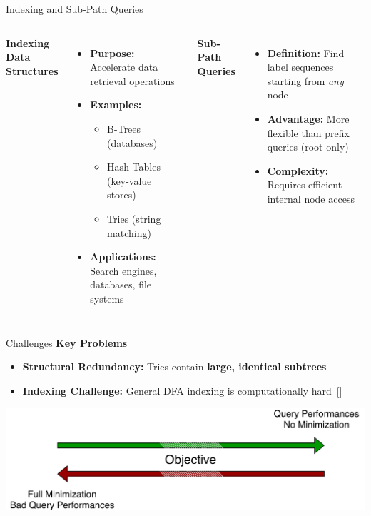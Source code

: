 \documentclass[aspectratio=169]{beamer}
\begin{document}
\begin{frame}{Indexing and Sub-Path Queries}
	\begin{columns}[t]
		\textcolor{oiBlue}{\textbf{Indexing Data Structures}}
		\begin{itemize}
			\item \textbf{Purpose:} Accelerate data retrieval operations
			\item \textbf{Examples:}
			      \begin{itemize}
				      \item B-Trees (databases)
				      \item Hash Tables (key-value stores)
				      \item Tries (string matching)
			      \end{itemize}
			\item \textbf{Applications:} Search engines, databases, file systems
		\end{itemize}

		\textcolor{oiRed}{\textbf{Sub-Path Queries}}
		\begin{itemize}
			\item \textbf{Definition:} Find label sequences starting from \textit{any} node
			\item \textbf{Advantage:} More flexible than prefix queries (root-only)
			\item \textbf{Complexity:} Requires efficient internal node access
		\end{itemize}
	\end{columns}
\end{frame}

\begin{frame}{Challenges}
	\textcolor{oiRed}{\textbf{Key Problems}}
	\begin{itemize}
		\item \textbf{Structural Redundancy:} Tries contain \textbf{large, identical subtrees}
		\item \textbf{Indexing Challenge:} General DFA indexing is computationally hard~[\cite{equiGraphsCannotBe2023}]
	\end{itemize}

	\vspace{0.2cm}
	\centering
	\includegraphics[width=1\textwidth]{img/tradeoff.png}
\end{frame}
\end{document}
